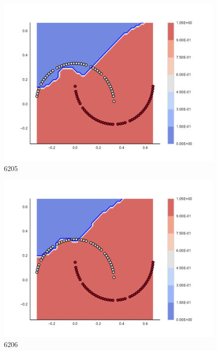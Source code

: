 \begin{subfigure}[b]{0.09\textwidth}
    \includegraphics[clip, trim=2.35cm 1.75cm 4.5cm 0cm,width=\textwidth]{img/convergence/6205.pdf}
    \caption{6205}
    \label{fig:convergence_6205}
\end{subfigure}
%
\begin{subfigure}[b]{0.09\textwidth}
    \includegraphics[clip, trim=2.35cm 1.75cm 4.5cm 0cm,width=\textwidth]{img/convergence/6206.pdf}
    \caption{6206}
    \label{fig:convergence_6206}
\end{subfigure}
%
